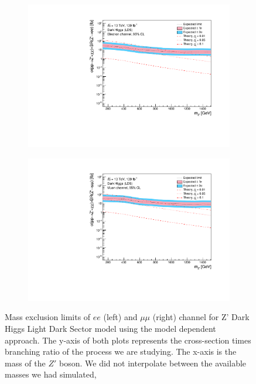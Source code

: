 \documentclass[12pt, a4paper]{book}
\begin{document}
\begin{figure}[!ht]
	\centering
   \begin{subfigure}[b]{0.49\textwidth}
      \centering
      \includegraphics[width=1\textwidth]{Limits/DH_LDS/mass_exclusion_ee.pdf}
      \end{subfigure}
   \hfill
   \begin{subfigure}[b]{0.49\textwidth}
      \centering
      \includegraphics[width=1\textwidth]{Limits/DH_LDS/mass_exclusion_uu.pdf}
      \end{subfigure}
   \caption[Expected mass exclusion limits of $ee$ and $\mu\mu$ channel for all Z' DH LDS model using the model dependent approach]{Mass exclusion limits of $ee$ (left) and $\mu\mu$ (right) channel for Z' Dark Higgs Light Dark Sector model using the model dependent approach. The y-axis of both plots represents the cross-section times branching ratio of the process we are studying. The x-axis is the mass of the $Z'$ boson. We did not interpolate between the available masses we had simulated, 
}
\end{figure}
\end{document}
